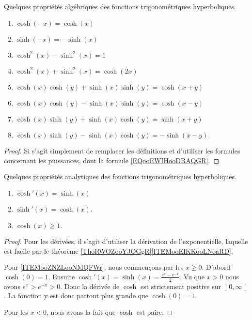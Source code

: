 \begin{proposition}     \label{PROPooUNHHooIksdoJ}
	Quelques propriétés algébriques des fonctions trigonométriques hyperboliques.
	\begin{enumerate}
		\item
		      \( \cosh(-x)=\cosh(x)\)
		\item
		      \( \sinh(-x)=-\sinh(x)\)
		\item
		      \( \cosh^2(x)-\sinh^2(x)=1\)
		\item       \label{ITEMooSJBDooAiRgjj}
		      \( \cosh^2(x)+\sinh^2(x)=\cosh(2x)\)
		\item
		      \( \cosh(x)\cosh(y)+\sinh(x)\sinh(y)=\cosh(x+y)\)
		\item       \label{ITEMooOJRFooUCUaDl}
		      \( \cosh(x)\cosh(y)-\sinh(x)\sinh(y)=\cosh(x-y)\)
		\item
		      \( \cosh(x)\sinh(y)+\sinh(x)\cosh(y)=\sinh(x+y)\)
		\item
		      \( \cosh(x)\sinh(y)-\sinh(x)\cosh(y)=-\sinh(x-y)\).
	\end{enumerate}
\end{proposition}

\begin{proof}
	Si s'agit simplement de remplacer les définitions et d'utiliser les formules concernant les puissances, dont la formule \eqref{EQooEWIHooDRAQGR}.
\end{proof}

\begin{proposition}     \label{PROPooAOOHooXvLfrZ}
	Quelques propriétés analytiques des fonctions trigonométriques hyperboliques.
	\begin{enumerate}
		\item
		      \( \cosh'(x)=\sinh(x)\)
		\item
		      \( \sinh'(x)=\cosh(x)\).
		\item       \label{ITEMooZNZLooNMQFWr}
		      \( \cosh(x)\geq 1\).
	\end{enumerate}
\end{proposition}

\begin{proof}
	Pour les dérivées, il s'agit d'utiliser la dérivation de l'exponentielle, laquelle est facile par le théorème \ref{ThoRWOZooYJOGgR}\ref{ITEMooEIKKooLNoaRD}.

	Pour \ref{ITEMooZNZLooNMQFWr}, nous commençons par les \( x\geq 0\). D'abord \( \cosh(0)=1\). Ensuite \( \cosh'(x)=\sinh(x)=\frac{  e^{x}- e^{-x} }{ 2 }\). Vu que \( x> 0\) nous avons \(  e^{x}> e^{-x}>0\). Donc la dérivée de \( \cosh\) est strictement positive sur \( \mathopen] 0 , \infty \mathclose[\). La fonction y est donc partout plus grande que \( \cosh(0)=1\).

	Pour les \( x<0\), nous avons la fait que \( \cosh\) est paire.
\end{proof}


